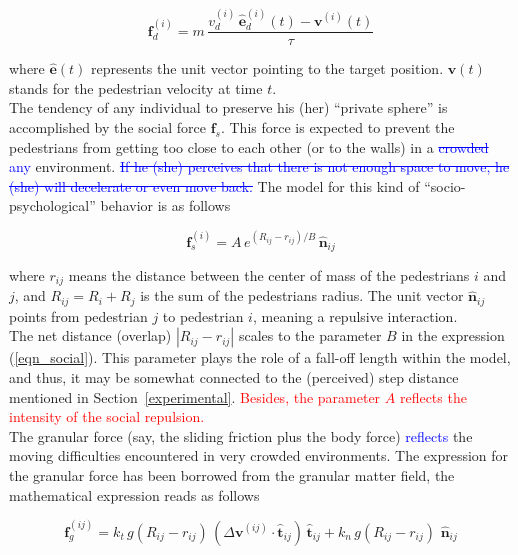\documentclass[preprint,12pt]{elsarticle}
\begin{document}
\begin{equation}
\mathbf{f}_d^{(i)}=m\,\displaystyle\frac{v_d^{(i)}\,
\hat{\mathbf{e}}_d^{(i)}(t)-
 \mathbf{v}^{(i)}(t)}{\tau}
\end{equation}


\noindent where $\hat{\mathbf{e}}(t)$ represents the unit vector pointing to 
the target position. $\mathbf{v}(t)$ stands for the pedestrian velocity at time 
$t$. \\

The tendency of any individual to preserve his (her) ``private sphere'' is 
accomplished by the social force $\mathbf{f}_s$. This force is expected to 
prevent the pedestrians from getting too close to each other (or to the walls) 
in a \textcolor{blue}{\sout{crowded} any} environment. \textcolor{blue}{\sout{If he (she) perceives that there is not enough space 
to move, he (she) will decelerate or even move back.}} The model for this kind of 
``socio-psychological'' behavior is as follows

\begin{equation}
 \mathbf{f}_s^{(i)}=A\,e^{(R_{ij}-r_{ij})/B}\,\hat{\mathbf{n}}_{ij}
 \label{eqn_social}
\end{equation}

\noindent where $r_{ij}$ means the distance between the center of mass of the 
pedestrians $i$ and $j$, and $R_{ij}=R_i+R_j$ is the sum of the pedestrians 
radius. The unit vector $\hat{\mathbf{n}}_{ij}$ points from pedestrian $j$ to 
pedestrian $i$, meaning a repulsive interaction.\\ 

The net distance (overlap) $|R_{ij}-r_{ij}|$ scales to the parameter $B$ in the 
expression (\ref{eqn_social}). This parameter plays the role of a fall-off 
length within the model, and thus, it may be somewhat connected to the 
(perceived) step distance mentioned in Section~\ref{experimental}. 
\textcolor{red}{Besides, the parameter $A$ reflects the intensity of the social repulsion.} \\    

The granular force (say, the sliding friction plus the body force) \textcolor{blue}{reflects} 
the moving difficulties encountered in very crowded environments. The 
expression for the granular force has been borrowed from the granular 
matter field, the mathematical expression reads as follows

\begin{equation}
 \mathbf{f}_g^{(ij)}=k_t\,g(R_{ij}-r_{ij})\,
(\Delta\mathbf{v}^{(ij)}\cdot\hat{\mathbf{t}}_{ij})\,\hat{\mathbf{t}}_{ij}+
k_n\,g(R_{ij}-r_{ij})\,
\,\hat{\mathbf{n}}_{ij}\label{eqn_friction}
\end{equation}
\end{document}
